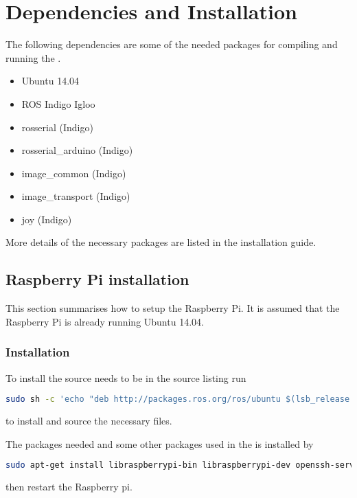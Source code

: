 \chapter{Dependencies and Installation}\label{app:dependencies}
The following dependencies are some of the needed packages for compiling and running the \abbrROV.
\begin{itemize}
    \item Ubuntu 14.04
    \item ROS Indigo Igloo
    \item rosserial (Indigo)
    \item rosserial\_arduino (Indigo)
    \item image\_common (Indigo) 
    \item image\_transport (Indigo)
    \item joy (Indigo)
\end{itemize}

More details of the necessary packages are listed in the installation guide.

\section{Raspberry Pi installation}
This section summarises how to setup the Raspberry Pi. It is assumed that the Raspberry Pi is already running Ubuntu 14.04.

\subsection{\abbrROS Installation}
To install \abbrROS the \abbrROS source needs to be in the source listing run

\begin{lstlisting}[language=bash]
sudo sh -c 'echo "deb http://packages.ros.org/ros/ubuntu $(lsb_release -sc) main" > /etc/apt/sources.list.d/ros-latest.list' && sudo apt-get install ros-indigo-ros-base -y && sudo rosdep init && rosdep update && echo "source /opt/ros/indigo/setup.bash" >> ~/.bashrc && source ~/.bashrc && sudo apt-get upgrade -y && sudo ln -s /usr /opt/vc
\end{lstlisting}
to install \abbrROS and source the necessary files.

The packages needed and some other packages used in the \abbrROV is installed by
\begin{lstlisting}[language=bash]
sudo apt-get install libraspberrypi-bin libraspberrypi-dev openssh-server build-essential avahi-daemon linux-firmware python-rosinstall ros-indigo-rosserial ros-indigo-rosserial-arduino ros-indigo-image-common ros-indigo-image-transport-plugins git && sudo sh -c 'echo "start_x=1\ngpu_mem=128" >> /boot/config.txt'
\end{lstlisting}
then restart the Raspberry pi.

